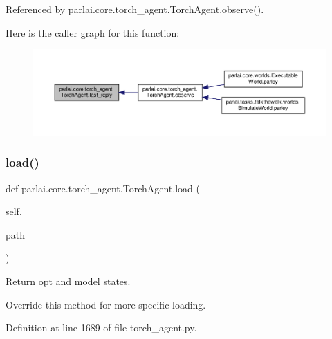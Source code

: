 Referenced by parlai.\+core.\+torch\+\_\+agent.\+Torch\+Agent.\+observe().

Here is the caller graph for this function\+:
\nopagebreak
\begin{figure}[H]
\begin{center}
\leavevmode
\includegraphics[width=350pt]{classparlai_1_1core_1_1torch__agent_1_1TorchAgent_a32921aa09a682ee752d4822a5f5ebbb4_icgraph}
\end{center}
\end{figure}
\mbox{\label{classparlai_1_1core_1_1torch__agent_1_1TorchAgent_af626fc7d32fc9b0dfeec167a52353baf}} 
\subsubsection{\texorpdfstring{load()}{load()}}
{\footnotesize\ttfamily def parlai.\+core.\+torch\+\_\+agent.\+Torch\+Agent.\+load (\begin{DoxyParamCaption}\item[{}]{self,  }\item[{}]{path }\end{DoxyParamCaption})}

\begin{DoxyVerb}Return opt and model states.

Override this method for more specific loading.
\end{DoxyVerb}
 

Definition at line 1689 of file torch\+\_\+agent.\+py.



